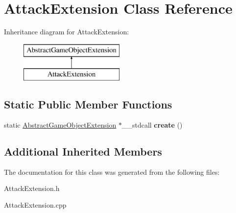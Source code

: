 \hypertarget{class_attack_extension}{}\section{Attack\+Extension Class Reference}
\label{class_attack_extension}
Inheritance diagram for Attack\+Extension\+:\begin{figure}[H]
\begin{center}
\leavevmode
\includegraphics[height=2.000000cm]{class_attack_extension}
\end{center}
\end{figure}
\subsection*{Static Public Member Functions}
\begin{DoxyCompactItemize}
\item 
\mbox{\label{class_attack_extension_ae1d31cc1bfefd2efe92475978b1a071c}} 
static \mbox{\hyperlink{class_abstract_game_object_extension}{Abstract\+Game\+Object\+Extension}} $\ast$\+\_\+\+\_\+stdcall {\bfseries create} ()
\end{DoxyCompactItemize}
\subsection*{Additional Inherited Members}


The documentation for this class was generated from the following files\+:\begin{DoxyCompactItemize}
\item 
Attack\+Extension.\+h\item 
Attack\+Extension.\+cpp\end{DoxyCompactItemize}
